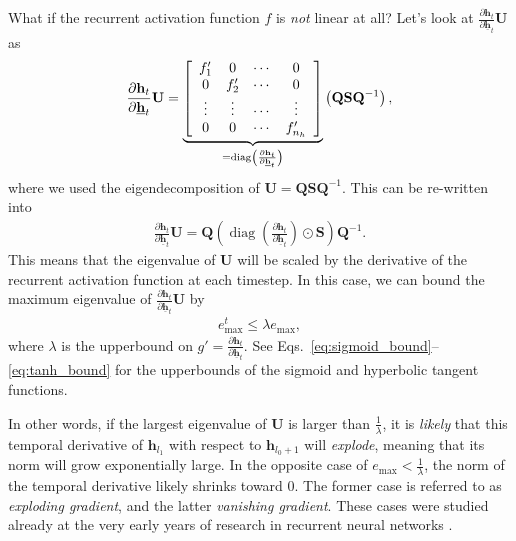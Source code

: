\documentclass{report}
\newcommand{\vect}[1]{\mathbf{#1}}
\newcommand{\matr}[1]{\mathbf{#1}}
\newcommand{\diag}[0]{\operatorname{diag}}
\newcommand{\vh}[0]{\vect{h}}
\newcommand{\mQ}[0]{\matr{Q}}
\newcommand{\mU}[0]{\matr{U}}
\newcommand{\mS}{\matr{S}}
\begin{document}
What if the recurrent activation function $f$ is {\em not} linear at all? Let's
look at $\frac{\partial \vh_{t}}{\partial \underline{\vh}_{t}} \mU$ as 
\begin{align*}
    \frac{\partial \vh_{t}}{\partial \underline{\vh}_{t}} \mU = 
        \underbrace{
    \left[ 
            \begin{array}{c c c c}
                f_1' & 0 & \cdots & 0 \\
                0 & f_2' & \cdots & 0 \\
                \vdots & \vdots & \cdots & \vdots \\
                0 & 0 & \cdots & f_{n_h}'
            \end{array}
    \right] 
        }_{=\diag\left( \frac{\partial \vh_{t}}{\partial \underline{\vh}_{t}}\right)}
    \left(\mQ \mS \mQ^{-1}\right),
\end{align*}
where we used the eigendecomposition of $\mU=\mQ \mS \mQ^{-1}$. This can be
re-written into
\begin{align*}
    \frac{\partial \vh_{t}}{\partial \underline{\vh}_{t}} \mU = 
    \mQ \left( \diag\left(\frac{\partial \vh_{t}}{\partial
            \underline{\vh}_{t}}\right)
    \odot \mS \right) \mQ^{-1}.
\end{align*}
This means that the eigenvalue of $\mU$ will be scaled by the derivative of the
recurrent activation function at each timestep. In this case, we can bound the
maximum eigenvalue of $\frac{\partial \vh_{t}}{\partial \underline{\vh}_{t}}
\mU$ by
\begin{align*}
    e_{\max}^t \leq \lambda e_{\max},
\end{align*}
where $\lambda$ is the upperbound on $g'=\frac{\partial \vh_{t}}{\partial
\underline{\vh}_{t}}$. See Eqs.~\eqref{eq:sigmoid_bound}--\eqref{eq:tanh_bound}
for the upperbounds of the sigmoid and hyperbolic tangent functions.

In other words, if the largest eigenvalue of $\mU$ is larger than
$\frac{1}{\lambda}$, it is {\em likely} that this temporal derivative of
$\vh_{l_1}$ with respect to $\vh_{l_0+1}$ will {\em explode}, meaning that its
norm will grow exponentially large. In the opposite case of $e_{\max} <
\frac{1}{\lambda}$, the norm of the temporal derivative likely shrinks toward
$0$. The former case is referred to as {\em exploding gradient}, and the latter
{\em vanishing gradient}. These cases were studied already at the very early
years of research in recurrent neural
networks \citep{bengio1994learning,hochreiter2001gradient}.
\end{document}
